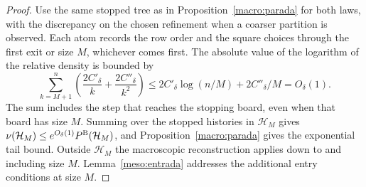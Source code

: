 \begin{proof}
Use the same stopped tree as in Proposition~\ref{macro:parada} for both laws, with the discrepancy
on the chosen refinement when a coarser partition is observed. Each atom records the row order
and the square choices through the first exit or size $M$, whichever comes first. The absolute
value of the logarithm of the relative density is bounded by
\[
 \sum_{k=M+1}^{n}\left(\frac{2C'_\delta}{k}+\frac{2C''_\delta}{k^2}\right)
 \le 2C'_\delta\log(n/M)+2C''_\delta/M=O_\delta(1).
\]
The sum includes the step that reaches the stopping board, even when that board has size $M$.
Summing over the stopped histories in $\mathcal H_M$ gives
$\nu(\mathcal H_M)\le e^{O_\delta(1)}P^{\rm B}(\mathcal H_M)$, and Proposition~\ref{macro:parada}
gives the exponential tail bound. Outside $\mathcal H_M$ the macroscopic reconstruction applies down to
and including size $M$. Lemma~\ref{meso:entrada} addresses the additional entry conditions at size $M$.
\end{proof}
